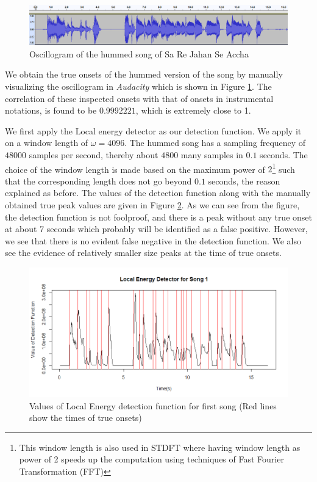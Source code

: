 \documentclass[10pt]{article}
\begin{document}
\begin{figure}
    \centering
    \includegraphics[width = \textwidth]{oscillogram_sa_re_jahan_se_accha.png}
    \caption{Oscillogram of the hummed song of Sa Re Jahan Se Accha}
    \label{fig:oscillo_song1}
\end{figure}


We obtain the true onsets of the hummed version of the song by manually visualizing the oscillogram in \textit{Audacity} which is shown in Figure \ref{fig:oscillo_song1}. The correlation of these inspected onsets with that of onsets in instrumental notations, is found to be $0.9992221$, which is extremely close to 1.  

We first apply the Local energy detector as our detection function. We apply it on a window length of $\omega = 4096$. The hummed song has a sampling frequency of $48000$ samples per second, thereby about $4800$ many samples in $0.1$ seconds. The choice of the window length is made based on the maximum power of $2$\footnote{This window length is also used in STDFT where having window length as power of 2 speeds up the computation using techniques of Fast Fourier Transformation (FFT)} such that the corresponding length does not go beyond $0.1$ seconds, the reason explained as before. The values of the detection function along with the manually obtained true peak values are given in Figure \ref{fig:energy_song1}. As we can see from the figure, the detection function is not foolproof, and there is a peak without any true onset at about 7 seconds which probably will be identified as a false positive. However, we see that there is no evident false negative in the detection function. We also see the evidence of relatively smaller size peaks at the time of true onsets.

\begin{figure}
    \centering
    \includegraphics[width = \textwidth]{energy_sa_re_jahan_se_accha.png}
    \caption{Values of Local Energy detection function for first song (Red lines show the times of true onsets)}
    \label{fig:energy_song1}
\end{figure}
\end{document}
